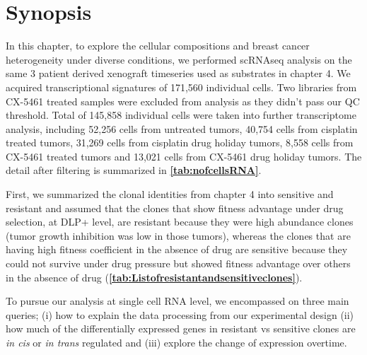  \section{Synopsis}
In this chapter, to explore the cellular compositions and breast cancer heterogeneity under diverse conditions, we performed scRNAseq analysis on the same 3 patient derived xenograft timeseries used as substrates in chapter 4. We acquired transcriptional signatures of 171,560 individual cells. Two libraries from CX-5461 treated samples were excluded from analysis as they didn't pass our QC threshold. Total of 145,858 individual cells were taken into further transcriptome analysis, including  52,256 cells from untreated tumors, 40,754 cells from cisplatin treated tumors, 31,269 cells from cisplatin drug holiday tumors, 8,558 cells from CX-5461 treated tumors and 13,021 cells from CX-5461 drug holiday tumors. The detail after filtering is summarized in  \textbf{\autoref{tab:nofcellsRNA}}.

First, we summarized the clonal identities from chapter 4 into sensitive and resistant and  assumed that the clones that show fitness advantage under drug selection, at DLP+ level, are resistant because they were high abundance clones (tumor growth inhibition was low in those tumors), whereas the clones that are having high fitness coefficient in the absence of drug are sensitive because they could not survive under drug pressure but showed fitness advantage over others in the absence of drug (\textbf{\autoref{tab:Listofresistantandsensitiveclones}}).
 

To pursue our analysis at single cell RNA level, we encompassed on three main queries; (i) how to explain the data processing from our experimental design (ii) how much of the differentially expressed genes in resistant vs sensitive clones are \textit{in cis} or \textit{in trans} regulated and (iii) explore the change of expression overtime.  

